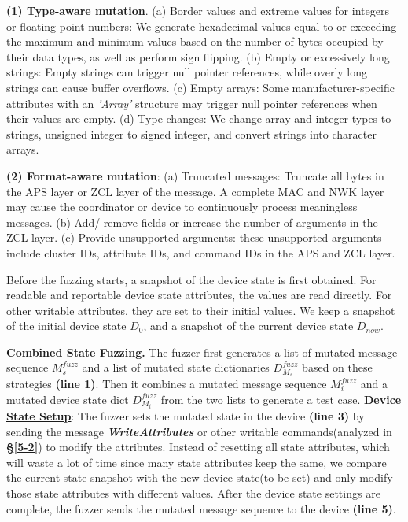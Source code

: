 \documentclass[10pt,journal,compsoc]{IEEEtran}
\begin{document}
\textbf{(1) Type-aware mutation}. (a) Border values and extreme values for integers or floating-point numbers: We generate hexadecimal values equal to or exceeding the maximum and minimum values based on the number of bytes occupied by their data types, as well as perform sign flipping. (b) Empty or excessively long strings: Empty strings can trigger null pointer references, while overly long strings can cause buffer overflows. (c) Empty arrays: Some manufacturer-specific attributes with an \emph{'Array'} structure may trigger null pointer references when their values are empty. (d) Type changes: We change array and integer types to strings, unsigned integer to signed integer, and convert strings into character arrays. 

\textbf{(2) Format-aware mutation}: (a) Truncated messages: Truncate all bytes in the APS layer or ZCL layer of the message. A complete MAC and NWK layer may cause the coordinator or device to continuously process meaningless messages. (b) Add/ remove fields or increase the number of arguments in the ZCL layer. (c) Provide unsupported arguments: these unsupported arguments include cluster IDs, attribute IDs, and command IDs in the APS and ZCL layer.

Before the fuzzing starts, a snapshot of the device state is first obtained. For readable and reportable device state attributes, the values are read directly. For other writable attributes, they are set to their initial values. We keep a snapshot of the initial device state $D_{0}$, and a snapshot of the current device state $D_{now}$. \vspace{0.1cm}

\textbf{Combined State Fuzzing.} The fuzzer first generates a list of mutated message sequence $M_{s}^{fuzz}$ and a list of mutated state dictionaries $D_{M_{s}}^{fuzz}$ based on these strategies  \textbf{(line 1)}. Then it combines a mutated message sequence $M_{i}^{fuzz}$ and a mutated device state dict $D_{M_{i}}^{fuzz}$ from the two lists to generate a test case. \underline{\textbf{Device State Setup}}: The fuzzer sets the mutated state in the device \textbf{(line 3)} by sending the message \textbf{\textit{WriteAttributes}} or other writable commands(analyzed in \textbf{\S\ref{5-2}}) to modify the attributes. Instead of resetting all state attributes, which will waste a lot of time since many state attributes keep the same, we compare the current state snapshot with the new device state(to be set) and only modify those state attributes with different values. After the device state settings are complete, the fuzzer sends the mutated message sequence to the device \textbf{(line 5)}. \vspace{0.1cm}
\end{document}
